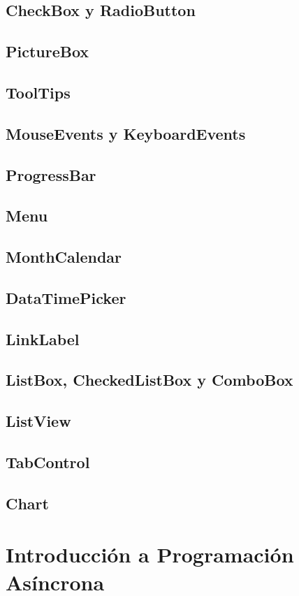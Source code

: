 \documentclass[12pt,a4paper]{report}
\begin{document}
{\section{CheckBox y RadioButton}
\section{PictureBox}
\section{ToolTips}
\section{MouseEvents y KeyboardEvents}
\section{ProgressBar}
\section{Menu}
\section{MonthCalendar}
\section{DataTimePicker}
\section{LinkLabel}
\section{ListBox, CheckedListBox y ComboBox}
\section{ListView}
\section{TabControl}
\section{Chart}

\chapter{Introducción a Programación Asíncrona}
}
\end{document}
